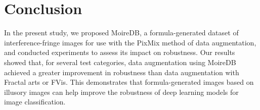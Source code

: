 \section{Conclusion}
\label{sec:conclusion}

In the present study, we proposed MoireDB,
a formula-generated dataset of interference-fringe images
for use with the PixMix method of data augmentation,
and conducted experiments to assess its impact on robustness.
Our results showed that, for several test categories,
data augmentation using MoireDB
achieved a greater improvement in robustness than
data augmentation with Fractal arts or FVis.
This demonstrates that formula-generated images based on illusory images
can help improve the robustness of deep learning models for image classification.
